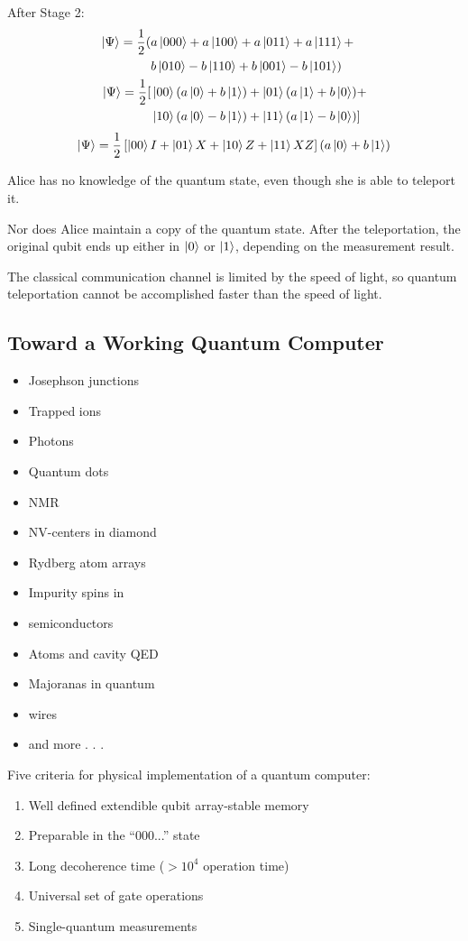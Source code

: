 After Stage 2:
\begin{align*}
    \ket{\Psi}=\frac{1}{2}(&a\ket{000}+a\ket{100}+a\ket{011}+a\ket{111}+\\
    &b\ket{010}-b\ket{110}+b\ket{001}-b\ket{101})\\
    \ket{\Psi}=\frac{1}{2}[&\ket{00}(a\ket{0}+b\ket{1})+\ket{01}(a\ket{1}+b\ket{0})+\\
    &\ket{10}(a\ket{0}-b\ket{1})+\ket{11}(a\ket{1}-b\ket{0})]
\end{align*}
\begin{align*}
    \ket{\Psi}=\frac{1}{2}\left[\ket{00}I+\ket{01}X+\ket{10}Z+\ket{11}XZ\right](a\ket{0}+b\ket{1})
\end{align*}

Alice has no knowledge of the quantum state, even though she is able to teleport it. 

Nor does Alice maintain a copy of the quantum state. After the teleportation, the original qubit ends up either in $\ket{0}$ or $\ket{1}$, depending on the measurement result. 

The classical communication channel is limited by the speed of light, so quantum teleportation cannot be accomplished faster than the speed of light.


\subsection{Toward a Working Quantum Computer}
\begin{itemize}
    \item\small Josephson junctions
    \item\small Trapped ions
    \item\small Photons
    \item\small Quantum dots
    \item\small NMR
    \item\small NV-centers in diamond
    \item\small Rydberg atom arrays
    \item\small Impurity spins in
    \item\small semiconductors
    \item\small Atoms and cavity QED
    \item\small Majoranas in quantum
    \item\small wires
    \item\small and more . . .
\end{itemize}

Five criteria for physical implementation of a quantum computer: 
\begin{enumerate}
    \item\small Well defined extendible qubit array-stable memory
    \item\small Preparable in the ``000...'' state
    \item\small Long decoherence time ($>10^4$ operation time)
    \item\small Universal set of gate operations
    \item\small Single-quantum measurements
\end{enumerate}

